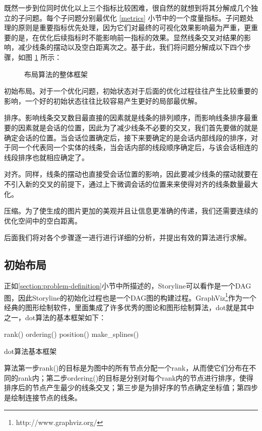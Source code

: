 既然一步到位同时优化以上三个指标比较困难，很自然的就想到将其分解成几个独立的子问题。每个子问题分别最优化 \ref{metrics} 小节中的一个度量指标。子问题处理的原则是重要指标优先处理，因为它们对最终的可视化效果影响最为严重，更重要的是，在优化后续指标时不能影响前一指标的效果。显然线条交叉对结果的影响，减少线条的摆动以及空白距离次之。基于此，我们将问题分解成以下四个步骤，如图 \ref{fig:layout-steps} 所示：
\begin{figure}[htb]
    \centering
    \caption{布局算法的整体框架}
    \label{fig:layout-steps}
\end{figure}

\begin{asparaenum}[(a)]
\item 初始布局。对于一个优化问题，初始状态对于后面的优化过程往往产生比较重要的影响，一个好的初始状态往往比较容易产生更好的局部最优解。
\item 排序。影响线条交叉数目最直接的因素就是线条的排列顺序，而影响线条排序最重要的因素就是会话的位置，因此为了减少线条不必要的交叉，我们首先要做的就是确定会话的位置。当会话位置确定后，接下来要确定的是会话内部线段的排序，对于同一个代表同一个实体的线条，当会话内部的线段顺序确定后，与该会话相连的线段排序也就相应确定了。
\item 对齐。同样，线条的摆动也直接受会话位置的影响，因此要减少线条的摆动就要在不引入新的交叉的前提下，通过上下微调会话的位置来来使得对齐的线条数量最大化。
\item 压缩。为了使生成的图片更加的美观并且让信息更准确的传递，我们还需要连续的优化空间中的空白距离。
\end{asparaenum}

后面我们将对各个步骤逐一进行进行详细的分析，并提出有效的算法进行求解。

\subsection{初始布局}
正如\ref{section:problem-definition}小节中所描述的，Storyline可以看作是一个DAG图，因此Storyline的初始化过程也是一个DAG图的构建过程。GraphViz\footnote{http://www.graphviz.org/}作为一个经典的图形绘制软件，里面集成了许多优秀的图论和图形绘制算法，dot\cite{Koutsofios1991, Gansner1993a}就是其中之一，dot算法的基本框架如下：
\begin{algorithm}[htb]
  rank()\;
  ordering()\;
  position()\;
  make\_splines()\;
  \caption{dot算法基本框架}
  \label{algo:draw-graph}
\end{algorithm}
算法第一步rank()的目标是为图中的所有节点分配一个rank，从而使它们分布在不同的rank内；第二步ordering()的目标是分别对每个rank内的节点进行排序，使得排序后的节点产生最少的线条交叉；第三步是为排好序的节点确定坐标值；第四步是绘制连接节点的线条。

